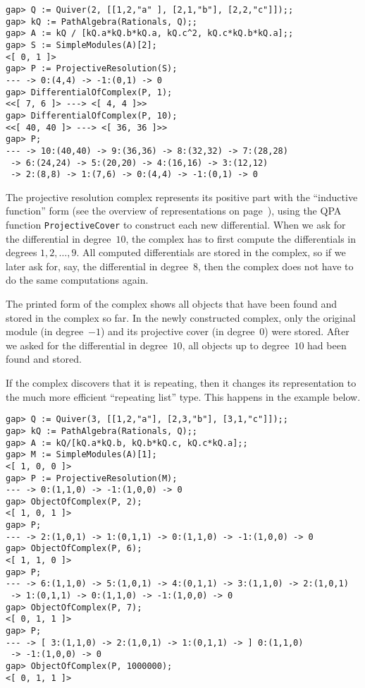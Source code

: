 \documentclass{amsart}
\theoremstyle{definition}
\newcommand{\code}[1]{\texttt{#1}}
\theoremstyle{theoretic}
\begin{document}
\begin{verbatim}
gap> Q := Quiver(2, [[1,2,"a" ], [2,1,"b"], [2,2,"c"]]);;
gap> kQ := PathAlgebra(Rationals, Q);;
gap> A := kQ / [kQ.a*kQ.b*kQ.a, kQ.c^2, kQ.c*kQ.b*kQ.a];;
gap> S := SimpleModules(A)[2];
<[ 0, 1 ]>
gap> P := ProjectiveResolution(S);
--- -> 0:(4,4) -> -1:(0,1) -> 0
gap> DifferentialOfComplex(P, 1);
<<[ 7, 6 ]> ---> <[ 4, 4 ]>>
gap> DifferentialOfComplex(P, 10);
<<[ 40, 40 ]> ---> <[ 36, 36 ]>>
gap> P;
--- -> 10:(40,40) -> 9:(36,36) -> 8:(32,32) -> 7:(28,28)
 -> 6:(24,24) -> 5:(20,20) -> 4:(16,16) -> 3:(12,12)
 -> 2:(8,8) -> 1:(7,6) -> 0:(4,4) -> -1:(0,1) -> 0
\end{verbatim}

The projective resolution complex represents its positive part with
the ``inductive function'' form (see the overview of representations
on page~\pageref{complex-part-types}), using the QPA function
\code{ProjectiveCover} to construct each new differential.  When we
ask for the differential in degree~$10$, the complex has to first
compute the differentials in degrees $1, 2, \ldots, 9$.  All computed
differentials are stored in the complex, so if we later ask for, say,
the differential in degree~$8$, then the complex does not have to do
the same computations again.

The printed form of the complex shows all objects that have been found
and stored in the complex so far.  In the newly constructed complex,
only the original module (in degree~$-1$) and its projective cover (in
degree~$0$) were stored.  After we asked for the differential in
degree~$10$, all objects up to degree~$10$ had been found and stored.

If the complex discovers that it is repeating, then it changes its
representation to the much more efficient ``repeating list'' type.
This happens in the example below.

\begin{verbatim}
gap> Q := Quiver(3, [[1,2,"a"], [2,3,"b"], [3,1,"c"]]);;
gap> kQ := PathAlgebra(Rationals, Q);;
gap> A := kQ/[kQ.a*kQ.b, kQ.b*kQ.c, kQ.c*kQ.a];;
gap> M := SimpleModules(A)[1];
<[ 1, 0, 0 ]>
gap> P := ProjectiveResolution(M);
--- -> 0:(1,1,0) -> -1:(1,0,0) -> 0
gap> ObjectOfComplex(P, 2);
<[ 1, 0, 1 ]>
gap> P;
--- -> 2:(1,0,1) -> 1:(0,1,1) -> 0:(1,1,0) -> -1:(1,0,0) -> 0
gap> ObjectOfComplex(P, 6);
<[ 1, 1, 0 ]>
gap> P;
--- -> 6:(1,1,0) -> 5:(1,0,1) -> 4:(0,1,1) -> 3:(1,1,0) -> 2:(1,0,1)
 -> 1:(0,1,1) -> 0:(1,1,0) -> -1:(1,0,0) -> 0
gap> ObjectOfComplex(P, 7);
<[ 0, 1, 1 ]>
gap> P;
--- -> [ 3:(1,1,0) -> 2:(1,0,1) -> 1:(0,1,1) -> ] 0:(1,1,0)
 -> -1:(1,0,0) -> 0
gap> ObjectOfComplex(P, 1000000);
<[ 0, 1, 1 ]>
\end{verbatim}
\end{document}
